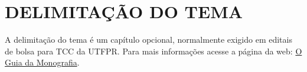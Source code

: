 
\chapter{DELIMITAÇÃO DO TEMA}
\label{chap:delimitacao}

A delimitação do tema é um capítulo opcional, normalmente exigido em editais de bolsa para TCC da UTFPR. Para mais informações acesse a página da web: \href{https://guiadamonografia.com.br/como-fazer-a-delimitacao-do-tema/}{O Guia da Monografia}.
